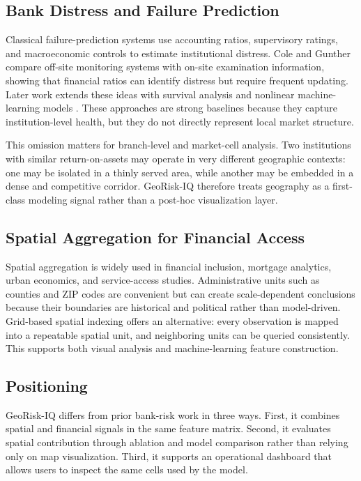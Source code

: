 \documentclass[conference]{IEEEtran}
\begin{document}
\subsection{Bank Distress and Failure Prediction}
Classical failure-prediction systems use accounting ratios, supervisory
ratings, and macroeconomic controls to estimate institutional distress.
Cole and Gunther \cite{cole1998} compare off-site monitoring systems with
on-site examination information, showing that financial ratios can identify
distress but require frequent updating. Later work extends these ideas with
survival analysis and nonlinear machine-learning models
\cite{betz2014,tian2015}. These approaches are strong baselines because
they capture institution-level health, but they do not directly represent
local market structure.

This omission matters for branch-level and market-cell analysis. Two
institutions with similar return-on-assets may operate in very different
geographic contexts: one may be isolated in a thinly served area, while
another may be embedded in a dense and competitive corridor. GeoRisk-IQ
therefore treats geography as a first-class modeling signal rather than a
post-hoc visualization layer.

\subsection{Spatial Aggregation for Financial Access}
Spatial aggregation is widely used in financial inclusion, mortgage
analytics, urban economics, and service-access studies. Administrative
units such as counties and ZIP codes are convenient but can create
scale-dependent conclusions because their boundaries are historical and
political rather than model-driven. Grid-based spatial indexing offers an
alternative: every observation is mapped into a repeatable spatial unit,
and neighboring units can be queried consistently. This supports both
visual analysis and machine-learning feature construction.

\subsection{Positioning}
GeoRisk-IQ differs from prior bank-risk work in three ways. First, it
combines spatial and financial signals in the same feature matrix. Second,
it evaluates spatial contribution through ablation and model comparison
rather than relying only on map visualization. Third, it supports an
operational dashboard that allows users to inspect the same cells used by
the model.
\end{document}

